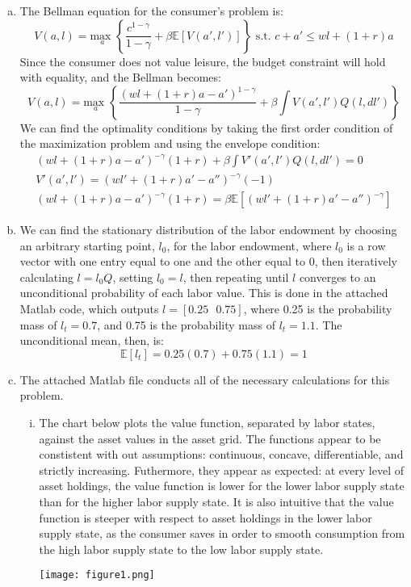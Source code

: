 \documentclass{article}
\newcommand{\usmax}[1]{\underset{#1}{\text{max }}}
\newcommand{\E}[1]{\mathbb{E}\left[#1\right]} %
\begin{document}
\begin{enumerate}[(a)]
	\item The Bellman equation for the consumer's problem is:
		\[
			V(a,l) = \usmax{a}\left\{\frac{c^{1-\gamma}}{1-\gamma} + \beta\E{V(a',l')}\right\}\text{ s.t. } c + a' \leq wl + (1+r)a 
		\]
		Since the consumer does not value leisure, the budget constraint will hold with equality, and the Bellman becomes:
		\[
			V(a,l) = \usmax{a}\left\{\frac{(wl + (1+r)a - a')^{1-\gamma}}{1-\gamma} + \beta\int V(a',l')Q(l,dl')\right\}
		\]
		We can find the optimality conditions by taking the first order condition of the maximization problem and using the envelope condition:
		\begin{eqnarray*}
			\left(wl + (1+r)a - a'\right)^{-\gamma}(1+r) + \beta\int V'(a',l')Q(l,dl') = 0	\\
			V'(a',l') = \left(wl' + (1+r)a' - a''\right)^{-\gamma}(-1)	\\
			\left(wl + (1+r)a - a'\right)^{-\gamma}(1+r) = \beta\E{\left(wl' + (1+r)a' - a''\right)^{-\gamma}}
		\end{eqnarray*}
	
	\item We can find the stationary distribution of the labor endowment by choosing an arbitrary starting point, $l_0$, for the labor endowment, where $l_0$ is a row vector with one entry equal to one and the other equal to 0, then iteratively calculating ${l=l_0Q}$, setting ${l_0=l}$, then repeating until $l$ converges to an unconditional probability of each labor value. This is done in the attached Matlab code, which outputs ${l=\left[0.25\text{ }0.75\right]}$, where 0.25 is the probability mass of ${l_t=0.7}$, and 0.75 is the probability mass of ${l_t=1.1}$. The unconditional mean, then, is:
		\[
			\E{l_t} = 0.25(0.7) + 0.75(1.1) = 1
		\]
	
	
	\item The attached Matlab file conducts all of the necessary calculations for this problem.
		\begin{enumerate}[i.]
			\item The chart below plots the value function, separated by labor states, against the asset values in the asset grid. The functions appear to be constistent with out assumptions: continuous, concave, differentiable, and strictly increasing. Futhermore, they appear as expected: at every level of asset holdings, the value function is lower for the lower labor supply state than for the higher labor supply state. It is also intuitive that the value function is steeper with respect to asset holdings in the lower labor supply state, as the consumer saves in order to smooth consumption from the high labor supply state to the low labor supply state.
				\begin{center}
					\texttt{[image: figure1.png]}
				\end{center}
			

\end{enumerate}
\end{enumerate}
\end{document}
